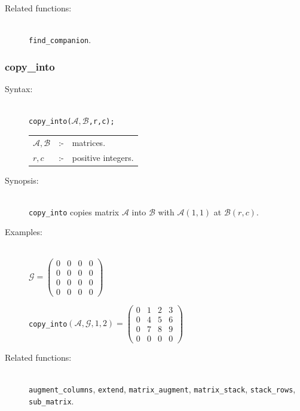 {\begin{description}
\item[Related functions:]\mbox{}\\
\texttt{find\_companion}.
\end{description}


\subsubsection{copy\_into}
\label{linalg:copy_into}
\hypertarget{operator:COPY_INTO}{}

\begin{description}
\item[Syntax:]\mbox{}\\
{\tt copy\_into($\mathcal{A,B}$,r,c);}\\[2mm]
\begin{tabular}{l l l}
$\mathcal{A,B}$ &:-& matrices. \\
$r,c$          &:-& positive integers.
\end{tabular}

\item[Synopsis:]\mbox{}\\
\texttt{copy\_into} copies matrix $\mathcal{A}$ into
                $\mathcal{B}$ with $\mathcal{A}(1,1)$ at $\mathcal{B}(r,c)$.

\item[Examples:]\mbox{}\\
  \(\mathcal{G} = \begin{pmatrix} 0 & 0 & 0 & 0 \\ 0 & 0 & 0 & 0 \\
    0 & 0 & 0 & 0 \\ 0 & 0 & 0 & 0 \end{pmatrix}\)

  \texttt{copy\_into}\((\mathcal{A,G},1,2)  =
  \begin{pmatrix} 0 & 1 & 2 & 3 \\ 0 & 4 & 5 & 6 \\ 0 & 7 & 8
    & 9 \\ 0 & 0 & 0 & 0  \end{pmatrix}\)

\item[Related functions:]\mbox{}\\
\texttt{augment\_columns}, \texttt{extend}, \texttt{matrix\_augment},
\texttt{matrix\_stack}, \texttt{stack\_rows}, \texttt{sub\_matrix}.

\end{description}


}
